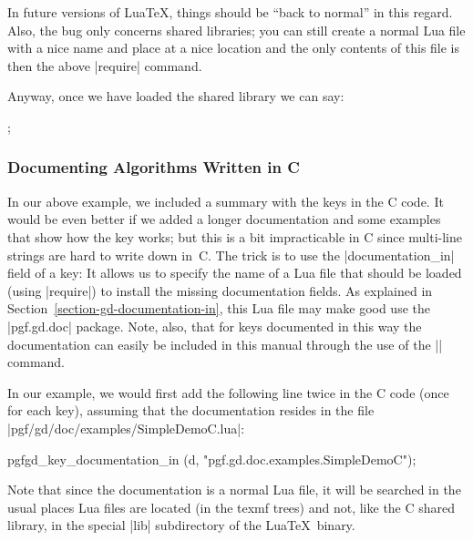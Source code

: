 In future versions of Lua\TeX, things should be ``back to normal'' in this
regard. Also, the bug only concerns shared libraries; you can still create a
normal Lua file with a nice name and place at a nice location and the only
contents of this file is then the above |require| command.

Anyway, once we have loaded the shared library we can say:
%
\begin{codeexample}
\tikz {};
\end{codeexample}


\subsubsection{Documenting Algorithms Written in C}
\label{section-gd-documenting-c-algos}

In our above example, we included a summary with the keys in the C code. It
would be even better if we added a longer documentation and some examples that
show how the key works; but this is a bit impracticable in C since multi-line
strings are hard to write down in~C. The trick is to use the |documentation_in|
field of a key: It allows us to specify the name of a Lua file that should be
loaded (using |require|) to install the missing documentation fields. As
explained in Section~\ref{section-gd-documentation-in}, this Lua file may make
good use the |pgf.gd.doc| package. Note, also, that for keys documented in this
way the documentation can easily be included in this manual through the use of
the || command.

In our example, we would first add the following line twice in the C code (once
for each key), assuming that the documentation resides in the file
|pgf/gd/doc/examples/SimpleDemoC.lua|:
%
\begin{codeexample}[code only, tikz syntax=false]
  pgfgd_key_documentation_in (d, "pgf.gd.doc.examples.SimpleDemoC");
\end{codeexample}

Note that since the documentation is a normal Lua file, it will be searched in
the usual places Lua files are located (in the texmf trees) and not, like the C
shared library, in the special |lib| subdirectory of the Lua\TeX\ binary.


